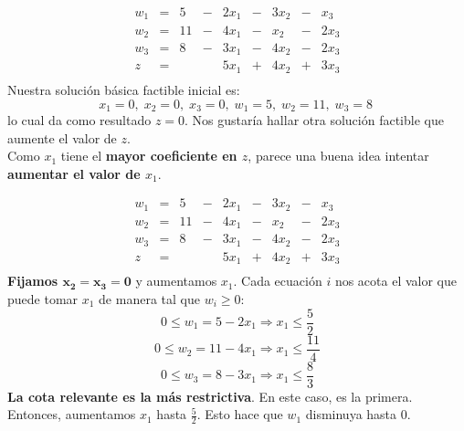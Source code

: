 \documentclass[10pt, aspectratio=169]{beamer}
\begin{document}
    \begin{frame}{}
        \[
            \begin{array}{rrrrrrrrr}
                w_1 & = & 5  & - & 2x_1 & - & 3x_2 & - & x_3  \\
                w_2 & = & 11 & - & 4x_1 & - & x_2  & - & 2x_3 \\
                w_3 & = & 8  & - & 3x_1 & - & 4x_2 & - & 2x_3 \\\hline
                z   & = &    &   & 5x_1 & + & 4x_2 & + & 3x_3 \\
            \end{array}
        \]
        Nuestra solución básica factible inicial es:
        \[x_1=0,\; x_2=0,\; x_3=0,\; w_1=5,\; w_2=11,\; w_3=8\;\]
        lo cual da como resultado $z=0$. Nos gustaría hallar otra solución factible que aumente el valor de $z$.\\
        \pause
        Como $x_1$ tiene el \textbf{mayor coeficiente en $z$}, parece una buena idea intentar
        \textbf{aumentar el valor de $x_1$}.

    \end{frame}

    \begin{frame}{}
        \small
        \[
            \begin{array}{rrrrrrrrr}
                w_1 & = & 5  & - & 2x_1 & - & 3x_2 & - & x_3  \\
                w_2 & = & 11 & - & 4x_1 & - & x_2  & - & 2x_3 \\
                w_3 & = & 8  & - & 3x_1 & - & 4x_2 & - & 2x_3 \\\hline
                z   & = &    &   & 5x_1 & + & 4x_2 & + & 3x_3 \\
            \end{array}
        \]
        \textbf{Fijamos $\mathbf{x_2=x_3=0}$} y aumentamos $x_1$. Cada ecuación $i$ nos acota el valor que puede tomar
        $x_1$ de manera tal que $w_i\geq0$:
        \[ 0\leq w_1 = 5-2x_1 \Rightarrow x_1 \leq \frac{5}{2} \]
        \[ 0\leq w_2 = 11-4x_1 \Rightarrow x_1 \leq \frac{11}{4} \]
        \[ 0\leq w_3 = 8-3x_1 \Rightarrow x_1 \leq \frac{8}{3} \]
        \pause
        \textbf{La cota relevante es la más restrictiva}. En este caso, es la primera. Entonces, aumentamos $x_1$ hasta
        $\frac{5}{2}$. Esto hace que $w_1$ disminuya hasta $0$.
    \end{frame}
\end{document}
